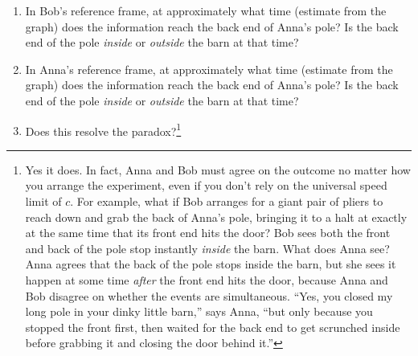 \begin{enumerate}[labparts]
\item In Bob's reference frame, at approximately what time (estimate from the graph) does the information reach the back end of Anna's pole?  Is the back end of the pole \textit{inside} or \textit{outside} the barn at that time?
\answerspace{0.8in}

\item In Anna's reference frame, at approximately what time (estimate from the graph) does the information reach the back end of Anna's pole?  Is the back end of the pole \textit{inside} or \textit{outside} the barn at that time?
\answerspace{0.8in}

\item Does this resolve the paradox?\footnote{Yes it does.  In fact, Anna and Bob must agree on the outcome no matter how you arrange the experiment, even if you don't rely on the universal speed limit of $c$.  For example, what if Bob arranges for a giant pair of pliers to reach down and grab the back of Anna's pole, bringing it to a halt at exactly at the same time that its front end hits the door?  Bob sees both the front and back of the pole stop instantly \textit{inside} the barn.  What does Anna see?  Anna agrees that the back of the pole stops inside the barn, but she sees it happen at some time \textit{after} the front end hits the door, because Anna and Bob disagree on whether the events are simultaneous. ``Yes, you closed my long pole in your dinky little barn,'' says Anna, ``but only because you stopped the front first, then waited for the back end to get scrunched inside before grabbing it and closing the door behind it.''}
\answerspace{0.8in}

\end{enumerate}
